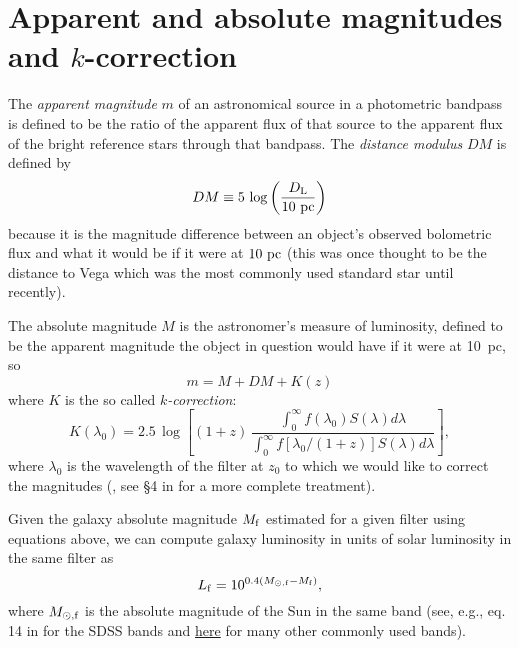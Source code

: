 \section{Apparent and absolute magnitudes and $k$-correction}
\label{sec:mML}

The {\em apparent magnitude\/} $m$ of an astronomical source in a
photometric bandpass is defined to be the ratio of the apparent flux
of that source to the apparent flux of the bright reference stars through
that bandpass.  The
{\em distance modulus\/} $DM$ is defined by
\begin{equation}
DM\equiv 5\,\log \left(\frac{D_{\rm L}}{10~{\rm pc}}\right)
\end{equation}
because it is the magnitude difference between an object's observed
bolometric flux and what it would be if it were at $10~{\rm pc}$ (this
was once thought to be the distance to Vega which was the most commonly used standard star until recently).  

The absolute magnitude $M$ is the
astronomer's measure of luminosity, defined to be the apparent
magnitude the object in question would have if it were at 10~pc, so
\begin{equation}
m=M+DM+K(z)
\label{eq:mM}
\end{equation}
where $K$ is the so called {\it $k$-correction}:
\begin{equation}
K(\lambda_0) = 2.5\,\log \left[(1+z)\,\frac{\int_0^{\infty} f(\lambda_0) S(\lambda)d\lambda}{\int_0^\infty f[\lambda_0/(1+z)]S(\lambda)d\lambda}\right],
\label{eq:kcorr}
\end{equation}
where $\lambda_0$ is the wavelength of the filter at $z_0$ to which we would like to correct the magnitudes (\href{http://adsabs.harvard.edu/abs/1968ApJ...154...21O}{\citealt{oke_sandage68}},  see \S 4 in \href{http://adsabs.harvard.edu/abs/2007AJ....133..734B}{\citealt{blanton_roweis07}} for a more complete treatment).

Given the galaxy absolute magnitude $M_{\rm f}$ estimated for a given filter using equations above, we can compute galaxy luminosity in units of solar luminosity in the same filter as 
\begin{equation}
L_{\rm f} = 10^{0.4(M_{\odot,\rm f}-M_{\rm f})},
\label{eq:LMf}
\end{equation}
where $M_{\odot,\rm f}$ is the absolute magnitude of the Sun in the same band (see, e.g., eq. 14 in \href{http://adsabs.harvard.edu/abs/2003ApJ...592..819B}{\citealt{blanton_etal03}} for the SDSS bands and \href{http://mips.as.arizona.edu/~cnaw/sun.html}{here} for many other commonly used bands).

